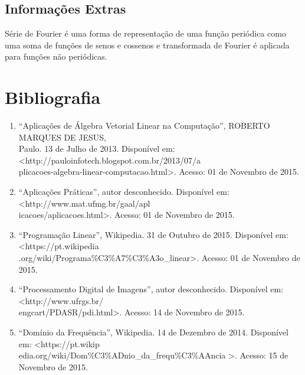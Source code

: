 \documentclass{article}
\begin{document}
        \subsection{Informações Extras}
        Série de Fourier é uma forma de representação de uma função periódica como uma soma de funções de senos e cossenos e transformada de Fourier é aplicada para funções não periódicas.

                
        
    \newpage
    
    \section{Bibliografia}
        
        \begin{enumerate}
        
        \item ``Aplicações de Álgebra Vetorial Linear na Computação'', ROBERTO MARQUES DE JESUS,\\Paulo. 13 de Julho de 2013. Disponível em: \textless http://pauloinfotech.blogspot.com.br/2013/07/a\\plicacoes-algebra-linear-computacao.html\textgreater. Acesso: 01 de Novembro de 2015.
        
        \item ``Aplicações Práticas'', autor desconhecido. Disponível em: \textless http://www.mat.ufmg.br/gaal/apl\\icacoes/aplicacoes.html\textgreater. Acesso: 01 de Novembro de 2015.
        
        \item ``Programação Linear'', Wikipedia. 31 de Outubro de 2015. Disponível em:
        \textless https://pt.wikipedia\\.org/wiki/Programa\%C3\%A7\%C3\%A3o\_linear\textgreater. Acesso: 01 de Novembro de 2015.
        
        \item ``Processamento Digital de Imagens'', autor desconhecido. Disponível em: \textless http://www.ufrgs.br/\\engcart/PDASR/pdi.html\textgreater. Acesso: 14 de Novembro de 2015.
        
        \item ``Domínio da Frequência'', Wikipedia. 14 de Dezembro de 2014. Disponível em: \textless https://pt.wikip\\edia.org/wiki/Dom\%C3\%ADnio\_da\_frequ\%C3\%AAncia \textgreater. Acesso: 15 de Novembro de 2015.
        

\end{enumerate}
\end{document}
